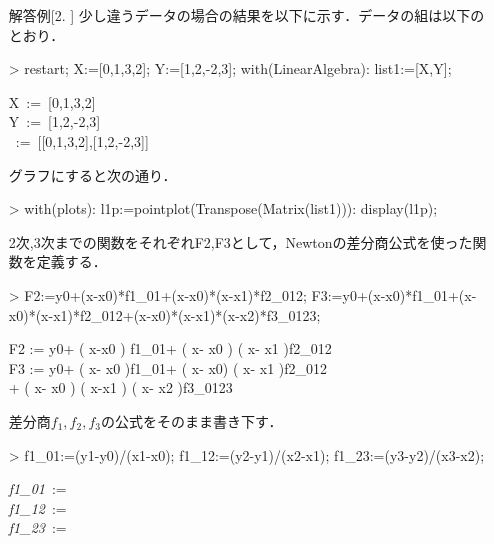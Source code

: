 \begin{itemize}
\item[解答例[2.]]
少し違うデータの場合の結果を以下に示す．データの組は以下のとおり．
\begin{MapleInput}
> restart;
X:=[0,1,3,2];
Y:=[1,2,-2,3];
with(LinearAlgebra):
list1:=[X,Y];
\end{MapleInput}

\begin{MapleOutputGather}
\displaystyle X\, := \,[0,1,3,2] \notag \\
\displaystyle Y\, := \,[1,2,-2,3] \notag \\
\, := \,[[0,1,3,2],[1,2,-2,3]] \notag
\end{MapleOutputGather}
グラフにすると次の通り．
\begin{MapleInput}
> with(plots):
l1p:=pointplot(Transpose(Matrix(list1))):
display(l1p);
\end{MapleInput}
2次,3次までの関数をそれぞれF2,F3として，Newtonの差分商公式を使った関数を定義する．
\begin{MapleInput}
> F2:=y0+(x-x0)*f1_01+(x-x0)*(x-x1)*f2_012;
F3:=y0+(x-x0)*f1_01+(x-x0)*(x-x1)*f2_012+(x-x0)*(x-x1)*(x-x2)*f3_0123;
\end{MapleInput}

\begin{MapleOutputGather}
F2 := y0+ \left( x-x0 \right) f1\_01+ \left( x- x0 \right)  \left( x- x1 \right)f2\_012 \notag \\
F3 := y0+ \left( x- x0 \right)f1\_01+ \left( x- x0\right)  \left( x- x1 \right)f2\_012\notag \\
+ \left( x- x0 \right)  \left( x-x1 \right)  \left( x- x2 \right)f3\_0123 \notag
\end{MapleOutputGather}
差分商$f_1, f_2, f_3$の公式をそのまま書き下す．
\begin{MapleInput}
> f1_01:=(y1-y0)/(x1-x0);
f1_12:=(y2-y1)/(x2-x1);
f1_23:=(y3-y2)/(x3-x2);
\end{MapleInput}

\begin{MapleOutputGather}
{\it f1\_01}\, := \,{} \notag \\
{\it f1\_12}\, := \,{}\notag \\
{\it f1\_23}\, := \,{}\notag 
\end{MapleOutputGather}


\end{itemize}
